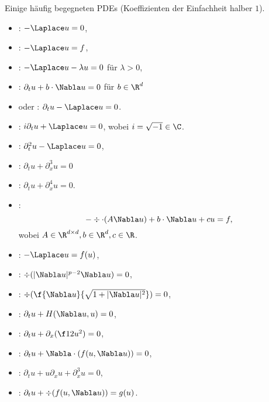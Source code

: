 \begin{ex} \label{1.10}
	Einige häufig begegneten PDEs (Koeffizienten der Einfachheit halber $1$).
	\begin{itemize}
		\item
			: $-\Laplace u = 0$,
		\item
			: $-\Laplace u = f$,
		\item
			: $-\Laplace u - \lambda u = 0$ für $\lambda > 0$,
		\item
			: $\partial_t u + b \cdot \Nabla u = 0$ für $b \in \R^d$
		\item
			 oder : $\partial_t u - \Laplace u = 0$.
		\item
			: $i \partial_t u + \Laplace u = 0$, wobei $i = \sqrt{-1} \in \C$.
		\item
			: $\partial_t^2 u - \Laplace u = 0$,
		\item
			: $\partial_t u + \partial_x^3 u = 0$
		\item
			: $\partial_t u + \partial_x^4 u = 0$.
		\item
			:
			\[
				- \div \cdot (A \Nabla u) + b \cdot \Nabla u + c u = f,
			\]
			wobei $A \in \R^{d\times d}, b \in \R^d, c \in \R$.
	\end{itemize}
\end{ex}

\begin{ex} \label{1.11}
	\begin{itemize}
		\item
			: $-\Laplace u = f(u)$,
		\item
			: $\div (|\Nabla u|^{p-2} \Nabla u) = 0$,
		\item
			: $\div ( \f{\Nabla u}{\sqrt{1 + |\Nabla u|^2}} ) = 0$,
		\item
			: $\partial_t u + H(\Nabla u, u) = 0$,
		\item
			: $\partial_t u + \partial_x(\f 12 u^2) = 0$,
		\item
			: $\partial_t u + \Nabla \cdot(f(u, \Nabla u)) = 0$,
		\item
			: $\partial_t u + u \partial_x u + \partial_x^3 u = 0$,
		\item
			: $\partial_t u + \div(f(u, \Nabla u)) = g(u)$.
	\end{itemize}
\end{ex}

